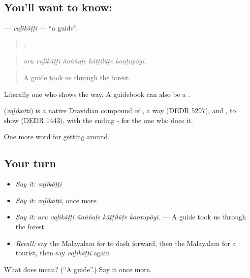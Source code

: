 \subsection*{You'll want to know: }
\textbf{} — \emph{vaḻikāṭṭi} — \textquotedblleft{}a guide\textquotedblright{}.

\begin{quote}
    .
\end{quote}

\begin{quote}
\emph{oru vaḻikāṭṭi ñaṅṅaḷe kāṭṭilūṭe koṇṭupōyi.}
\end{quote}

\begin{quote}
A guide took us through the forest.
\end{quote}

Literally one who shows the way. A guidebook can also be a .

\begin{cousinweb}
\textbf{} (\emph{vaḻikāṭṭi}) is a native Dravidian compound of , a way (DEDR 5297), and , to show (DEDR 1443), with the ending - for the one who does it.
\end{cousinweb}

\begin{grammarlens}[title={What you've built}]
One more word for getting around.
\end{grammarlens}

\subsection*{Your turn}
\begin{itemize}
\raggedright
  \item \emph{Say it:} \emph{vaḻikāṭṭi}
  \item \emph{Say it:} \emph{vaḻikāṭṭi}, once more
  \item \emph{Say it:} \emph{oru vaḻikāṭṭi ñaṅṅaḷe kāṭṭilūṭe koṇṭupōyi.} — A guide took us through the forest.
  \item \emph{Recall:} say the Malayalam for to dash forward, then the Malayalam for a tourist, then say \emph{vaḻikāṭṭi} again
\end{itemize}

\begin{tcolorbox}[breakable,colback=teal!4,colframe=teal!35!black,title={Before you move on}]
What does  mean? (\textquotedblleft{}A guide\textquotedblright{}.) Say it once more.
\end{tcolorbox}
